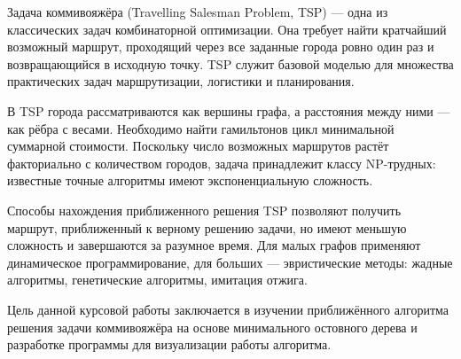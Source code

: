 Задача коммивояжёра (Travelling Salesman Problem, TSP) --- одна из классических задач комбинаторной оптимизации. Она требует найти кратчайший возможный маршрут, проходящий через все заданные города ровно один раз и возвращающийся в исходную точку. TSP служит базовой моделью для множества практических задач маршрутизации, логистики и планирования.

В TSP города рассматриваются как вершины графа, а расстояния между ними — как рёбра с весами. Необходимо найти гамильтонов цикл минимальной суммарной стоимости. Поскольку число возможных маршрутов растёт факториально с количеством городов, задача принадлежит классу NP-трудных: известные точные алгоритмы имеют экспоненциальную сложность.

Способы нахождения приближенного решения TSP позволяют получить маршрут, приближенный к верному решению задачи, но имеют меньшую сложность и завершаются за разумное время. Для малых графов применяют динамическое программирование, для больших --- эвристические методы: жадные алгоритмы, генетические алгоритмы, имитация отжига.

Цель данной курсовой работы заключается в изучении приближённого алгоритма решения задачи коммивояжёра на основе минимального остовного дерева и разработке программы для визуализации работы алгоритма.